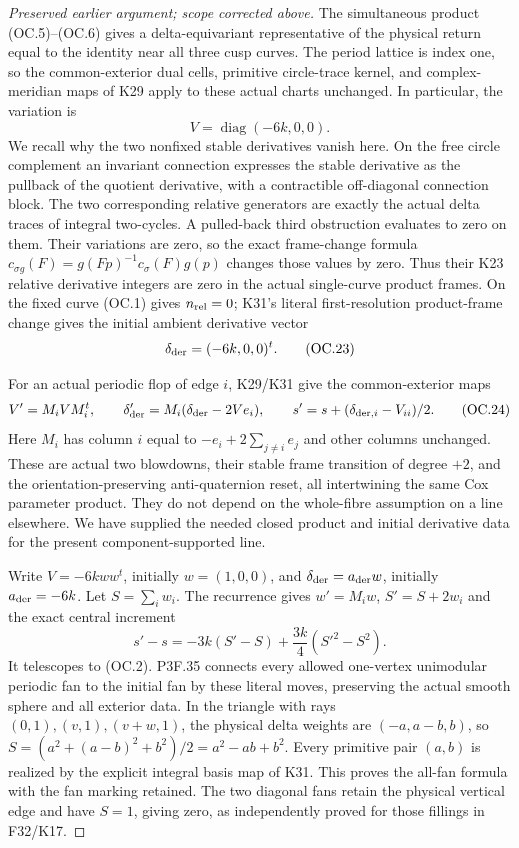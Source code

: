 \begin{proof}[Preserved earlier argument; scope corrected above]
The simultaneous product (OC.5)--(OC.6) gives a delta-equivariant
representative of the physical return equal to the identity near
all three cusp curves. The period lattice is index one, so the
common-exterior dual cells, primitive circle-trace kernel, and
complex-meridian maps of K29 apply to these actual charts unchanged.
In particular, the variation is
\[
       V=\operatorname{diag}(-6k,0,0).
\]
We recall why the two nonfixed stable derivatives vanish here. On
the free circle complement an invariant connection expresses the
stable derivative as the pullback of the quotient derivative, with
a contractible off-diagonal connection block. The two corresponding
relative generators are exactly the actual delta traces of integral
two-cycles. A pulled-back third obstruction evaluates to zero on
them. Their variations are zero, so the exact frame-change formula
\(c_{\sigma g}(F)=g(Fp)^{-1}c_\sigma(F)g(p)\) changes those values by zero.
Thus their K23 relative derivative integers are zero in the actual
single-curve product frames. On the fixed curve (OC.1) gives
\(n_{\rm rel}=0\); K31's literal first-resolution product-frame change gives
the initial ambient derivative vector
\[
                  \delta_{\rm der}=(-6k,0,0)^t.
 \tag{OC.23}
\]

For an actual periodic flop of edge \(i\), K29/K31 give the common-exterior
maps
\[
 V'=M_iVM_i^t,\qquad
 \delta'_{\rm der}=M_i(\delta_{\rm der}-2Ve_i),\qquad
 s'=s+(\delta_{{\rm der},i}-V_{ii})/2.
 \tag{OC.24}
\]
Here \(M_i\) has column \(i\) equal to \(-e_i+2\sum_{j\ne i}e_j\) and other
columns unchanged. These are actual two blowdowns, their stable
frame transition of degree \(+2\), and the orientation-preserving
anti-quaternion reset, all intertwining the same Cox parameter
product. They do not depend on the whole-fibre assumption on a
line elsewhere. We have supplied the needed closed product and
initial derivative data for the present component-supported line.

Write \(V=-6k ww^t\), initially \(w=(1,0,0)\), and
\(\delta_{\rm der}=a_{\rm der}w\), initially \(a_{\rm der}=-6k\). Let \(S=\sum_iw_i\).
The recurrence gives \(w'=M_iw\), \(S'=S+2w_i\) and the exact central
increment
\[
 s'-s=-3k(S'-S)+\frac{3k}{4}(S'^2-S^2).
\]
It telescopes to (OC.2). P3F.35 connects every allowed one-vertex
unimodular periodic fan to the initial fan by these literal moves,
preserving the actual smooth sphere and all exterior data. In the
triangle with rays \((0,1),(v,1),(v+w,1)\), the physical delta weights
are \((-a,a-b,b)\), so
\(S=(a^2+(a-b)^2+b^2)/2=a^2-ab+b^2\). Every primitive pair \((a,b)\) is
realized by the explicit integral basis map of K31. This proves the
all-fan formula with the fan marking retained. The two diagonal
fans retain the physical vertical edge and have \(S=1\), giving zero,
as independently proved for those fillings in F32/K17.


\end{proof}
